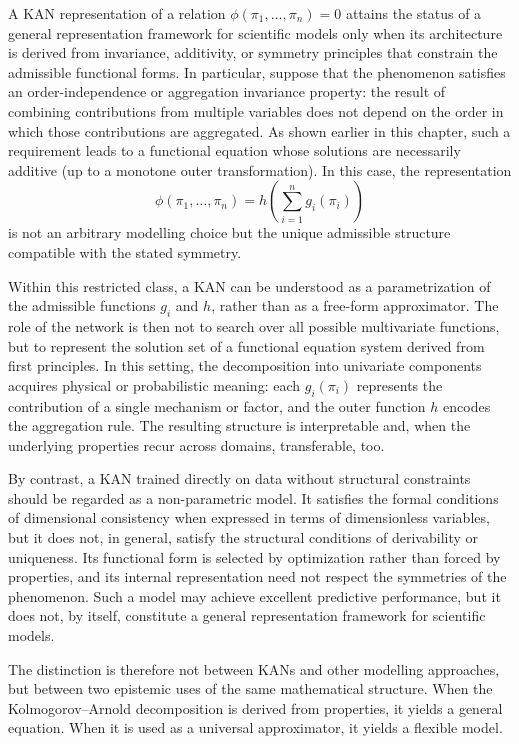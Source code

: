 A KAN representation of a relation $\phi(\pi_1,\ldots,\pi_n)=0$ attains
the status of a general representation framework for scientific models only when its architecture is
derived from invariance, additivity, or symmetry principles that constrain
the admissible functional forms.  In particular, suppose that the phenomenon
satisfies an order-independence or aggregation invariance property: the
result of combining contributions from multiple variables does not depend on
the order in which those contributions are aggregated.  As shown earlier in
this chapter, such a requirement leads to a functional equation whose
solutions are necessarily additive (up to a monotone outer transformation).
In this case, the representation
\begin{equation}
  \phi(\pi_1,\ldots,\pi_n)
  =
  h\!\left(\sum_{i=1}^n g_i(\pi_i)\right)
  \label{eq:kan_additive_general}
\end{equation}
is not an arbitrary modelling choice but the unique admissible structure compatible with the stated symmetry.

Within this restricted class, a KAN can be understood as a parametrization
of the admissible functions $g_i$ and $h$, rather than as a free-form
approximator.  The role of the network is then not to search over all
possible multivariate functions, but to represent the solution set of a
functional equation system derived from first principles.  In this setting, the decomposition into
univariate components acquires physical or probabilistic meaning: each
$g_i(\pi_i)$ represents the contribution of a single mechanism or factor,
and the outer function $h$ encodes the aggregation rule.  The resulting
structure is interpretable and, when the underlying properties recur across
domains, transferable, too.

By contrast, a KAN trained directly on data without structural constraints
should be regarded as a non-parametric model.  It satisfies the formal
conditions of dimensional consistency when expressed in terms of
dimensionless variables, but it does not, in general, satisfy the structural
conditions of derivability or uniqueness.  Its functional form is selected
by optimization rather than forced by properties, and its internal
representation need not respect the symmetries of the phenomenon.  Such a
model may achieve excellent predictive performance, but it does not, by
itself, constitute a general representation framework for scientific models.

The distinction is therefore not between KANs and other modelling
approaches, but between two epistemic uses of the same mathematical
structure.  When the Kolmogorov--Arnold decomposition is derived from
properties, it yields a general equation.  When it is used as a universal
approximator, it yields a flexible model.

